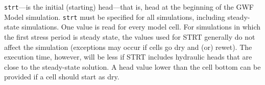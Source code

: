 
\item \texttt{strt}---is the initial (starting) head---that is, head at the beginning of the GWF Model simulation.  \texttt{strt} must be specified for all simulations, including steady-state simulations. One value is read for every model cell. For simulations in which the first stress period is steady state, the values used for STRT generally do not affect the simulation (exceptions may occur if cells go dry and (or) rewet). The execution time, however, will be less if STRT includes hydraulic heads that are close to the steady-state solution.  A head value lower than the cell bottom can be provided if a cell should start as dry.


